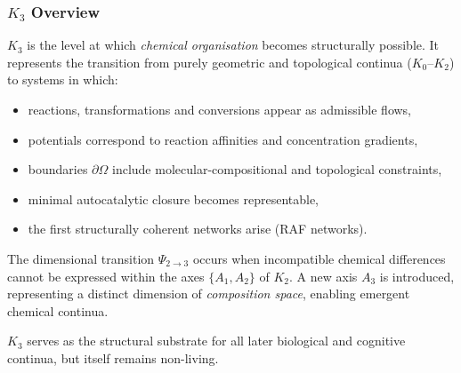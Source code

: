 

\subsubsection{\texorpdfstring{$K_3$}{K_3} Overview}
\label{sec:k3-overview}

$K_3$ is the level at which \emph{chemical organisation} becomes
structurally possible. It represents the transition from purely geometric
and topological continua ($K_0$--$K_2$) to systems in which:
\begin{itemize}
    \item reactions, transformations and conversions appear as admissible
          flows,
    \item potentials correspond to reaction affinities and concentration
          gradients,
    \item boundaries $\partial\Omega$ include molecular-compositional and
          topological constraints,
    \item minimal autocatalytic closure becomes representable,
    \item the first structurally coherent networks arise (RAF networks).
\end{itemize}

The dimensional transition $\Psi_{2\to3}$ occurs when incompatible
chemical differences cannot be expressed within the axes $\{A_1,A_2\}$ of
$K_2$. A new axis $A_3$ is introduced, representing a distinct dimension
of \emph{composition space}, enabling emergent chemical continua.

$K_3$ serves as the structural substrate for all later biological and
cognitive continua, but itself remains non-living.

